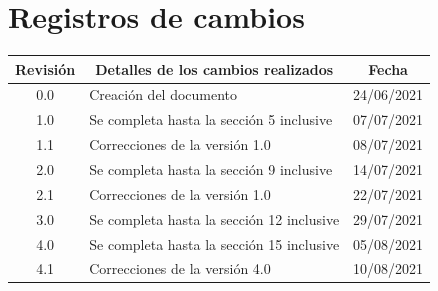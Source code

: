 \documentclass[
11pt, %
]{charter}
\begin{document}
\maketitle
\thispagestyle{empty}
\pagebreak


\thispagestyle{empty}
{\setlength{\parskip}{0pt}
\tableofcontents{}
}
\pagebreak


\section*{Registros de cambios}
\label{sec:registro}


\begin{table}[ht]
\label{tab:registro}
\centering
\begin{tabularx}{\linewidth}{@{}|c|X|c|@{}}
\hline
\rowcolor[HTML]{C0C0C0} 
Revisión & \multicolumn{1}{c|}{\cellcolor[HTML]{C0C0C0}Detalles de los cambios realizados} & Fecha      \\ \hline
0.0      & Creación del documento                                 			& 24/06/2021 \\ \hline
1.0      & Se completa hasta la sección 5 inclusive               	& 07/07/2021 \\ \hline
1.1      & Correcciones de la versión 1.0                 					& 08/07/2021 \\ \hline
2.0      & Se completa hasta la sección 9 inclusive					& 14/07/2021 \\ \hline
2.1      & Correcciones de la versión 1.0 									& 22/07/2021 \\ \hline
3.0      & Se completa hasta la sección 12 inclusive				& 29/07/2021 \\ \hline
4.0		& Se completa hasta la sección 15 inclusive					& 05/08/2021 \\ \hline
4.1		& Correcciones de la versión 4.0										& 10/08/2021 \\ \hline
\end{tabularx}
\end{table}
\end{document}
